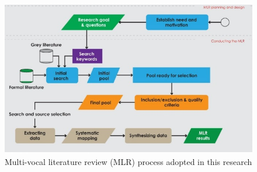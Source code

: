 \begin{figure}
  \includegraphics[width=\textwidth]{MLRprocess.jpg}
  \caption{Multi-vocal literature review (MLR) process adopted in this research ~\cite{SALTAN2021106510}}
  \Description{}
 \label{fig:MLRprocess}
\end{figure}

